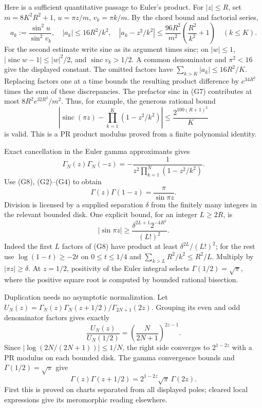 Here is a sufficient quantitative passage to Euler's product. For
$|z|\le R$, set $m=8K^2R^2+1$, $u=\pi z/m$, $v_k=\pi k/m$.
By the chord bound and factorial series,
\[
 a_k:=\frac{\sin^2u}{\sin^2v_k},\quad
 |a_k|\le16R^2/k^2,\quad
 \left|a_k-z^2/k^2\right|
 \le\frac{96R^2}{m^2}\left(\frac{R^2}{k^2}+1\right)\quad(k\le K).
\]
For the second estimate write sine as its argument times sinc; on
$|w|\le1$, $|\operatorname{sinc}w-1|\le |w|^2/2$, and
$\operatorname{sinc}v_k>1/2$. A common denominator and
$\pi^2<16$ give the displayed constant. The omitted factors have
$\sum_{k>K}|a_k|\le16R^2/K$.
Replacing factors one at a time bounds the resulting product difference
by $e^{34R^2}$ times the sum of these discrepancies. The prefactor sinc
in (G7) contributes at most $8R^2e^{32R^2}/m^2$.
Thus, for example, the generous rational bound
\[
 \left|\operatorname{sinc}(\pi z)
        -\prod_{k=1}^K(1-z^2/k^2)\right|
 \le\frac{2^{100(R+1)^2}}{K}                    \tag{G8}\label{eq:sine-rate}
\]
is valid. This is a PR product modulus proved from a finite polynomial
identity.

Exact cancellation in the Euler gamma approximants gives
\[
 \Gamma_N(z)\Gamma_N(-z)
       =-\frac1{z^2\prod_{k=1}^N(1-z^2/k^2)}.
\]
Use (G8), (G2)--(G4) to obtain
\[
 \Gamma(z)\Gamma(1-z)=\frac{\pi}{\sin\pi z}.
 \tag{G9}\label{eq:gamma-reflection}
\]
Division is licensed by a supplied separation $\delta$ from the finitely
many integers in the relevant bounded disk. One explicit bound, for an
integer $L\ge2R$, is
\[
 |\sin\pi z|\ge
       \frac{\delta^{2L+1}2^{-4R^2}}{(L!)^2}.
 \tag{G10}\label{eq:sine-apartness}
\]
Indeed the first $L$ factors of (G8) have product at least
$\delta^{2L}/(L!)^2$; for the rest use
$\log(1-t)\ge-2t$ on $0\le t\le1/4$ and
$\sum_{k>L}R^2/k^2\le R^2/L$. Multiply by $|\pi z|\ge\delta$.
At $z=1/2$, positivity of the Euler integral selects
$\Gamma(1/2)=\sqrt\pi$, where the positive square root is computed
by bounded rational bisection.

Duplication needs no asymptotic normalization. Let
$U_N(z)=\Gamma_N(z)\Gamma_N(z+1/2)/\Gamma_{2N+1}(2z)$.
Grouping its even and odd denominator factors gives exactly
\[
 \frac{U_N(z)}{U_N(1/2)}
       =\left(\frac{N}{2N+1}\right)^{2z-1}.
\]
Since $|\log(2N/(2N+1))|\le1/N$, the right side converges to
$2^{1-2z}$ with a PR modulus on each bounded disk. The gamma convergence
bounds and $\Gamma(1/2)=\sqrt\pi$ give
\[
 \Gamma(z)\Gamma(z+1/2)=2^{1-2z}\sqrt\pi\,\Gamma(2z).
 \tag{G11}\label{eq:gamma-duplication}
\]
First this is proved on charts separated from all displayed poles;
cleared local expressions give its meromorphic reading elsewhere.

